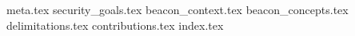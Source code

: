 {meta.tex}
{security_goals.tex}
{beacon_context.tex}
{beacon_concepts.tex}
{delimitations.tex}
{contributions.tex}
{index.tex}
